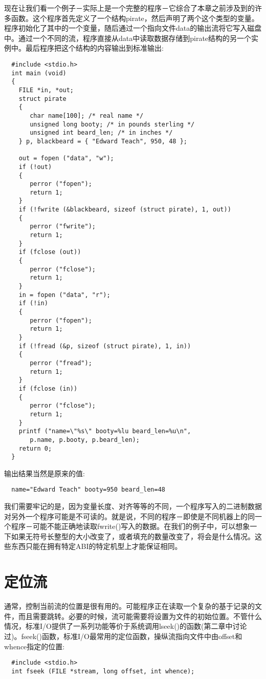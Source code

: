 现在让我们看一个例子－实际上是一个完整的程序－它综合了本章之前涉及到的许多函数。这个程序首先定义了一个结构pirate，然后声明了两个这个类型的变量。程序初始化了其中的一个变量，随后通过一个指向文件data的输出流将它写入磁盘中。通过一个不同的流，程序直接从data中读取数据存储到pirate结构的另一个实例中。最后程序把这个结构的内容输出到标准输出:
\begin{lstlisting}
  #include <stdio.h>
  int main (void)
  {
    FILE *in, *out;
    struct pirate
    {
       char name[100]; /* real name */
       unsigned long booty; /* in pounds sterling */
       unsigned int beard_len; /* in inches */
    } p, blackbeard = { "Edward Teach", 950, 48 };
    
    out = fopen ("data", "w");
    if (!out)
    {
       perror ("fopen");
       return 1;
    }
    if (!fwrite (&blackbeard, sizeof (struct pirate), 1, out))
    {
       perror ("fwrite");
       return 1;
    }
    if (fclose (out))
    {
       perror ("fclose");
       return 1;
    }
    in = fopen ("data", "r");
    if (!in)
    {
       perror ("fopen");
       return 1;
    }
    if (!fread (&p, sizeof (struct pirate), 1, in))
    {
       perror ("fread");
       return 1;
    }
    if (fclose (in))
    {
       perror ("fclose");
       return 1;
    }
    printf ("name=\"%s\" booty=%lu beard_len=%u\n",
       p.name, p.booty, p.beard_len);
    return 0;
  }
\end{lstlisting}


输出结果当然是原来的值:
\begin{verbatim}
  name="Edward Teach" booty=950 beard_len=48
\end{verbatim}

我们需要牢记的是，因为变量长度、对齐等等的不同，一个程序写入的二进制数据对另外一个程序可能是不可读的。就是说，不同的程序－即使是不同机器上的同一个程序－可能不能正确地读取fwrite()写入的数据。在我们的例子中，可以想象一下如果无符号长整型的大小改变了，或者填充的数量改变了，将会是什么情况。这些东西只能在拥有特定ABI的特定机型上才能保证相同。 

\section{定位流}

通常，控制当前流的位置是很有用的。可能程序正在读取一个复杂的基于记录的文件，而且需要跳转。必要的时候，流可能需要将设置为文件的初始位置。不管什么情况，标准I/O提供了一系列功能等价于系统调用lseek()的函数(第二章中讨论过)。fseek()函数，标准I/O最常用的定位函数，操纵流指向文件中由offset和whence指定的位置:
\begin{lstlisting}
  #include <stdio.h>
  int fseek (FILE *stream, long offset, int whence);
\end{lstlisting}


